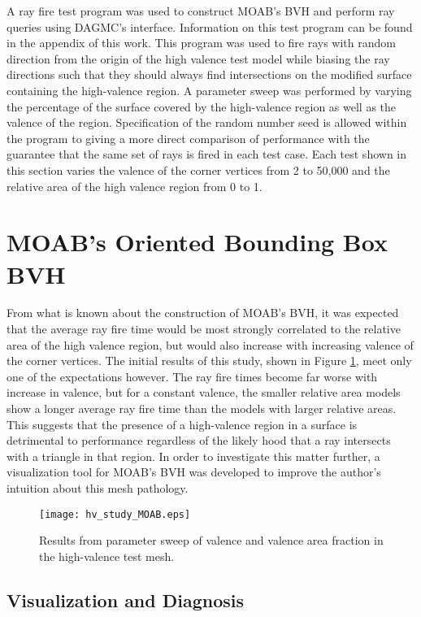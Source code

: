 A ray fire test program was used to construct MOAB's BVH and perform ray queries
using DAGMC's interface. Information on this test program can be found in the
appendix of this work. This program was used to fire rays with random direction
from the origin of the high valence test model while biasing the ray directions
such that they should always find intersections on the modified surface
containing the high-valence region. A parameter sweep was performed by varying
the percentage of the surface covered by the high-valence region as well as the
valence of the region. Specification of the random number seed is allowed within
the program to giving a more direct comparison of performance with the guarantee
that the same set of rays is fired in each test case. Each test shown in this
section varies the valence of the corner vertices from 2 to 50,000 and the
relative area of the high valence region from 0 to 1.

\section{MOAB's Oriented Bounding Box BVH}\label{sec:hv_study_MOAB}

From what is known about the construction of MOAB's BVH, it was expected that
the average ray fire time would be most strongly correlated to the relative area
of the high valence region, but would also increase with increasing valence of
the corner vertices. The initial results of this study, shown in Figure
\ref{fig:hv_study_moab}, meet only one of the expectations however. The ray fire
times become far worse with increase in valence, but for a constant valence, the
smaller relative area models show a longer average ray fire time than the models
with larger relative areas. This suggests that the presence of a high-valence
region in a surface is detrimental to performance regardless of the likely hood
that a ray intersects with a triangle in that region. In order to investigate
this matter further, a visualization tool for MOAB's BVH was developed to
improve the author's intuition about this mesh pathology.

\begin{figure}[H]
  \centering
    \texttt{[image: hv\_study\_MOAB.eps]}
    \caption{Results from parameter sweep of valence and valence area fraction
      in the high-valence test mesh.}
    \label{fig:hv_study_moab}
\end{figure}


\subsection{Visualization and Diagnosis}\label{subsec:hv_vis}

